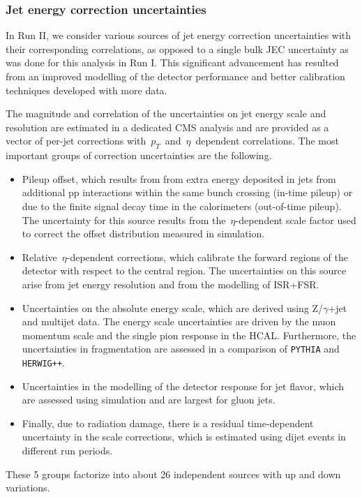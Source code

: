 \subsubsection{Jet energy correction uncertainties}
\label{sec:jec_unc}
In Run II, we consider various sources of jet energy correction uncertainties with their corresponding correlations, as opposed to a single bulk JEC uncertainty as was done for this analysis in Run I. This significant advancement has resulted from an improved modelling of the detector performance and better calibration techniques developed with more data. 

The magnitude and correlation of the uncertainties on jet energy scale and resolution are estimated in a dedicated CMS analysis and are provided as a vector of per-jet corrections with~$p_T$~and~$\eta$~dependent correlations. The most important groups of correction uncertainties are the following.
\begin{itemize}
\item Pileup offset, which results from from extra energy deposited in jets from additional pp interactions within the same bunch crossing (in-time pileup) or due to the finite signal decay time in the calorimeters (out-of-time pileup). The uncertainty for this source results from the~$\eta$-dependent scale factor used to correct the offset distribution measured in simulation.
\item Relative~$\eta$-dependent corrections, which calibrate the forward regions of the detector with respect to the central region. The uncertainties on this source arise from jet energy resolution and from the modelling of ISR+FSR.
\item Uncertainties on the absolute energy scale, which are derived using Z/$\gamma$+jet and multijet data. The energy scale uncertainties are driven by the muon momentum scale and the single pion response in the HCAL. Furthermore, the uncertainties in fragmentation are assessed in a comparison of \texttt{PYTHIA} and \texttt{HERWIG++}.
\item Uncertainties in the modelling of the detector response for jet flavor, which are assessed using simulation and are largest for gluon jets.
\item Finally, due to radiation damage, there is a residual time-dependent uncertainty in the scale corrections, which is estimated using dijet events in different run periods.
\end{itemize}
These 5 groups factorize into about 26 independent sources with up and down variations.

